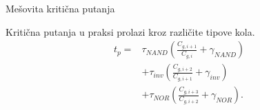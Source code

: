 \begin{frame}[label=09_3-s040]{Mešovita kritična putanja}
\begin{center}

\end{center}Kritična putanja u praksi prolazi kroz različite tipove kola.
\[\begin{aligned}
t_p={}&\tau_{NAND}\left(\frac{C_{g,i+1}}{C_{g,i}}+\gamma_{NAND}\right)\\
&+\tau_{inv}\left(\frac{C_{g,i+2}}{C_{g,i+1}}+\gamma_{inv}\right)\\
&+\tau_{NOR}\left(\frac{C_{g,i+3}}{C_{g,i+2}}+\gamma_{NOR}\right).
\end{aligned}\]
\end{frame}
